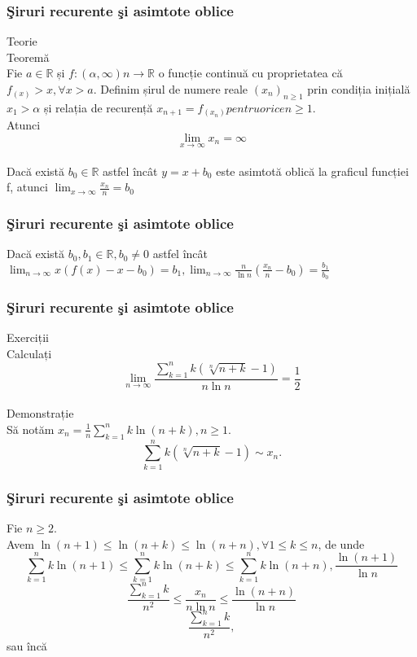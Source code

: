 \documentclass{beamer}
\theoremstyle{plain}
\begin{document}
\frame
{
\frametitle{\c Siruri recurente \c si asimtote oblice}
Teorie
\\ Teoremă
\\ Fie \(a\in \mathbb{R}\) și \(f: \left ( \alpha ,\infty  \right )n \to \mathbb{R}\) o funcție continuă cu proprietatea că \(f_{(x)}> x, \forall x > a\). Definim șirul de numere reale \(\left ( x_{n} \right )_{n\geq 1}\) prin condiția inițială \(x_{1}> \alpha\) și relația de recurență \(x_{n+1} = f_{\left ( x_{n} \right )} pentru orice  n\geq 1\).
\\ Atunci 
\begin{displaymath}
 \lim_{x \to \infty }x_{n} = \infty
\end{displaymath}
\\ Dacă există \(b_{0}\in \mathbb{R}\) astfel încât \(y = x + b_{0}\) este asimtotă oblică la graficul funcției f, atunci
\(\lim_{x \to \infty }\frac{x_{n}}{n}=b_{0}\)
}
\frame
{
\frametitle{\c Siruri recurente \c si asimtote oblice}
Dacă există \(b_{0}, b_{1}\in \mathbb{R}, b_{0 }\neq 0\) astfel încât 
\(\lim_{n \to \infty }x\left ( f\left ( x \right )-x-b_{0} \right )= b_{1},
\lim_{n \to \infty } \frac{n}{\ln n}\left ( \frac{x_{n}}{n} -b_{0}\right )=\frac{b_{1}}{b_{0}}\)

}
\frame
{
\frametitle{\c Siruri recurente \c si asimtote oblice}
Exerciții
\\ Calculați
\begin{displaymath}
 \lim_{n \to \infty }\frac{\sum_{k=1}^{n}k\left ( \sqrt[n]{n+k} -1\right )}{n\ln n } = \frac{1}{2}
\end{displaymath}
\\ Demonstrație 
\\ Să notăm \(x_{n} = \frac{1}{n}\sum_{k=1}^{n} k \ln \left ( n+k \right ), n \geq 1\). 
\begin{displaymath}
 \sum_{k=1}^{n}k\left ( \sqrt[n]{n+k}-1 \right )\sim x_{n}. \label{eq:2.1} \tag{2.1}
\end{displaymath}
}
\frame
{
\frametitle{\c Siruri recurente \c si asimtote oblice}
Fie \(n\geq 2\). 
\\ Avem \(\ln \left ( n+1 \right )\leq \ln \left ( n+k \right )\leq \ln \left ( n+n \right ), \forall 1\leq k\leq n\), de unde 
\begin{displaymath}
 \sum_{k=1}^{n} k \ln \left ( n+1 \right )\leq \sum_{k=1}^{n}k \ln \left ( n+k \right )\leq \sum_{k=1}^{n} k \ln \left ( n+n \right ), \frac{\ln \left ( n+1 \right )}{\ln n }
\end{displaymath}
\begin{displaymath}
 \frac{\sum_{k=1}^{n}k}{n^{2}}\leq \frac{x_{n}}{n\ln n}\leq \frac{\ln \left ( n+n \right )}{\ln n }
\end{displaymath}
\begin{displaymath}
 \frac{\sum_{k=1}^{n}k}{n^{2}},
\end{displaymath}
 sau încă
}
\end{document}
